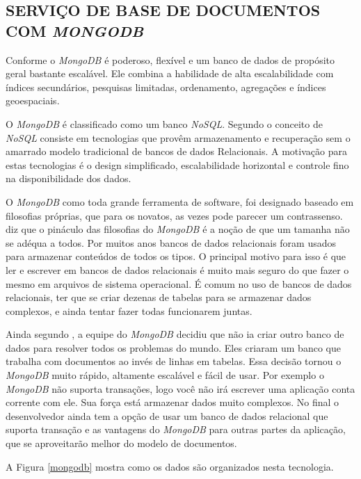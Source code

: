\subsection{SERVIÇO DE BASE DE DOCUMENTOS COM \emph{MONGODB}}
\label{mongodb_sec}

Conforme  o \emph{MongoDB} é poderoso, flexível e um banco de dados de propósito geral bastante escalável. Ele combina a habilidade de alta escalabilidade com índices secundários, pesquisas limitadas, ordenamento, agregações e índices geoespaciais.

O \emph{MongoDB} é classificado como um banco \emph{NoSQL}. Segundo  o conceito de \emph{NoSQL} consiste em tecnologias que provêm armazenamento e recuperação sem o amarrado modelo tradicional de bancos de dados Relacionais. A motivação para estas tecnologias é o design simplificado, escalabilidade horizontal e controle fino na disponibilidade dos dados.

O \emph{MongoDB} como toda grande ferramenta de software, foi designado baseado em filosofias próprias, que para os novatos, as vezes pode parecer um contrassenso. 
 diz que o pináculo das filosofias do \emph{MongoDB} é a noção de que um tamanha não se adéqua a todos. Por muitos anos bancos de dados relacionais foram usados para armazenar conteúdos de todos os tipos. O principal motivo para isso é que ler e escrever em bancos de dados relacionais é muito mais seguro do que fazer o mesmo em arquivos de sistema operacional.
É comum no uso de bancos de dados relacionais, ter que se criar dezenas de tabelas para se armazenar dados complexos, e ainda tentar fazer todas funcionarem juntas.

Ainda segundo , a equipe do \emph{MongoDB} decidiu que não ia criar outro banco de dados para resolver todos os problemas do mundo. Eles criaram um banco que trabalha com documentos ao invés de linhas em tabelas. Essa decisão tornou o \emph{MongoDB} muito rápido, altamente escalável e fácil de usar. Por exemplo o \emph{MongoDB} não suporta transações, logo você não irá escrever uma aplicação conta corrente com ele. Sua força está armazenar dados muito complexos. No final o desenvolvedor ainda tem a opção de usar um banco de dados relacional que suporta transação e as vantagens do \emph{MongoDB} para outras partes da aplicação, que se aproveitarão melhor do modelo de documentos.


A Figura \ref{mongodb} mostra como os dados são organizados nesta tecnologia.

